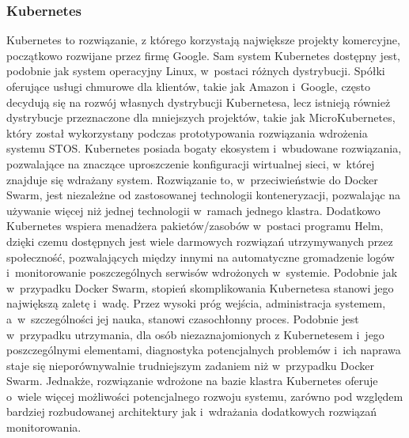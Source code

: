 \subsubsection{Kubernetes}
Kubernetes to rozwiązanie, z którego korzystają największe projekty komercyjne\cite{googleKubernetes}, początkowo rozwijane przez firmę Google. Sam system Kubernetes dostępny jest, podobnie jak system operacyjny Linux, w~postaci różnych dystrybucji. Spółki oferujące usługi chmurowe dla klientów, takie jak Amazon i~Google, często decydują się na rozwój własnych dystrybucji Kubernetesa, lecz istnieją również dystrybucje przeznaczone dla mniejszych projektów, takie jak MicroKubernetes\cite{microk8s}, który został wykorzystany podczas prototypowania rozwiązania wdrożenia systemu STOS. Kubernetes posiada bogaty ekosystem i~wbudowane rozwiązania, pozwalające na znaczące uproszczenie konfiguracji wirtualnej sieci, w~której znajduje się wdrażany system. Rozwiązanie to, w~przeciwieństwie do Docker Swarm, jest niezależne od zastosowanej technologii konteneryzacji, pozwalając na używanie więcej niż jednej technologii w~ramach jednego klastra. Dodatkowo Kubernetes wspiera menadżera pakietów/zasobów w~postaci programu Helm\cite{k8sHelm}, dzięki czemu dostępnych jest wiele darmowych rozwiązań utrzymywanych przez społeczność, pozwalających między innymi na automatyczne gromadzenie logów i~monitorowanie poszczególnych serwisów wdrożonych w~systemie. Podobnie jak w~przypadku Docker Swarm, stopień skomplikowania Kubernetesa stanowi jego największą zaletę i~wadę. Przez wysoki próg wejścia, administracja systemem, a~w~szczególności jej nauka, stanowi czasochłonny proces. Podobnie jest w~przypadku utrzymania, dla osób niezaznajomionych z Kubernetesem i~jego poszczególnymi elementami, diagnostyka potencjalnych problemów i~ich naprawa staje się nieporównywalnie trudniejszym zadaniem niż w~przypadku Docker Swarm. Jednakże, rozwiązanie wdrożone na bazie klastra Kubernetes oferuje o~wiele więcej możliwości potencjalnego rozwoju systemu, zarówno pod względem bardziej rozbudowanej architektury jak i~wdrażania dodatkowych rozwiązań monitorowania.

